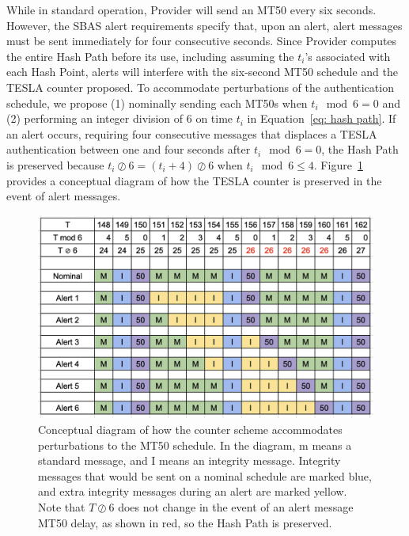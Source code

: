 \documentclass[letterpaper,times]{IONconf/IONconf}
\begin{document}
			While in standard operation, Provider will send an MT50 every six seconds.
			However, the SBAS alert requirements specify that, upon an alert, alert messages must be sent immediately for four consecutive seconds.
			Since Provider computes the entire Hash Path before its use, including assuming the $t_i$'s associated with each Hash Point, alerts will interfere with the six-second MT50 schedule and the TESLA counter proposed.
			To accommodate perturbations of the authentication schedule, we propose (1) nominally sending each MT50s when $t_i \mod 6 = 0$ and (2) performing an integer division of 6 on time $t_i$ in Equation~\eqref{eq: hash path}.
			If an alert occurs, requiring four consecutive messages that displaces a TESLA authentication between one and four seconds after $t_i \mod 6 = 0$, the Hash Path is preserved because $t_i \oslash 6 = (t_i + 4) \oslash 6$ when $t_i \mod 6 \leq 4 $.
			Figure~\ref{fig: alert schedule} provides a conceptual diagram of how the TESLA counter is preserved in the event of alert messages.

			\begin{figure}
				\centering
				\includegraphics[width=0.5\linewidth]{fig/alertschedule.png}
				\caption{Conceptual diagram of how the counter scheme accommodates perturbations to the MT50 schedule. In the diagram, m means a standard message, and I means an integrity message. Integrity messages that would be sent on a nominal schedule are marked blue, and extra integrity messages during an alert are marked yellow. Note that $T \oslash 6$ does not change in the event of an alert message MT50 delay, as shown in red, so the Hash Path is preserved.}
				\label{fig: alert schedule}
			\end{figure}
\end{document}
